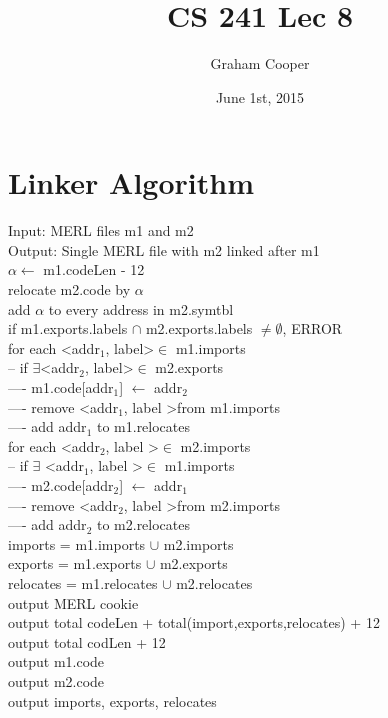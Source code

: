 \documentclass[12pt]{article}
\title{\vspace{-15ex}CS 241 Lec 8\vspace{-1ex}}
\date{June 1st, 2015}
\author{Graham Cooper}
\begin{document}
	\maketitle
	
	\section*{Linker Algorithm}
	
	Input: MERL files m1 and m2\\
	Output: Single MERL file with m2 linked after m1\\
	
	$\alpha \leftarrow$ m1.codeLen - 12\\
	relocate m2.code by $\alpha$\\
	add $\alpha$ to every address in m2.symtbl\\
	if m1.exports.labels $\cap$ m2.exports.labels $\neq \emptyset$, ERROR \\
	for each \textless addr$_1$, label\textgreater $\in$ m1.imports\\
	-- if $\exists$\textless addr$_2$, label\textgreater $\in$ m2.exports\\
	---- m1.code[addr$_1$] $\leftarrow$ addr$_2$\\
	---- remove \textless addr$_1$, label \textgreater from m1.imports\\
	---- add addr$_1$ to m1.relocates\\
	for each \textless addr$_2$, label \textgreater $\in$ m2.imports \\
	-- if $\exists$ \textless addr$_1$, label \textgreater $\in$ m1.imports\\
	---- m2.code[addr$_2$] $\leftarrow$ addr$_1$\\
	---- remove \textless addr$_2$, label \textgreater from m2.imports\\
	---- add addr$_2$ to m2.relocates\\
	imports = m1.imports $\cup$ m2.imports\\
	exports = m1.exports $\cup$ m2.exports\\
	relocates = m1.relocates $\cup$ m2.relocates\\
	output MERL cookie\\
	output total codeLen + total(import,exports,relocates) + 12\\
	output total codLen + 12\\
	output m1.code\\
	output m2.code\\
	output imports, exports, relocates\\
	
\end{document}
